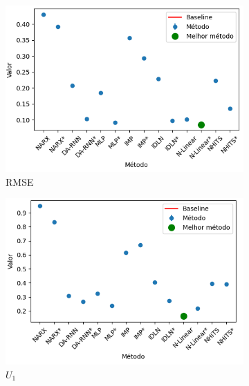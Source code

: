 \begin{figure}[htbp]
	\begin{subfigure}[b]{0.3\textwidth}
		\centering
		\includegraphics[width=\textwidth]{figuras/rmse_takens_brasil_results_test.png}
		\caption{\ac{RMSE}}
		\label{fig:rmse_takens_brasil_results_test}
	\end{subfigure}
	\hfill
	\begin{subfigure}[b]{0.3\textwidth}
		\centering
		\includegraphics[width=\textwidth]{figuras/u1_takens_brasil_results_test.png}
		\caption{\(U_1\)}
		\label{fig:u1_takens_brasil_results_test}
	\end{subfigure}
	\hfill
	\begin{subfigure}[b]{0.3\textwidth}
		\centering

\end{subfigure}
\end{figure}
